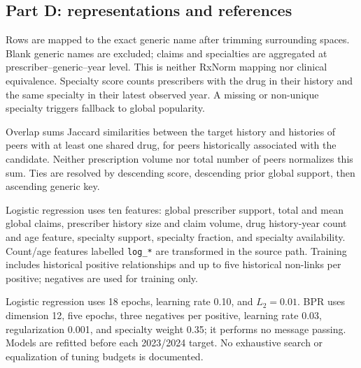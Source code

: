 \documentclass[10pt,a4paper]{article}
\newcommand{\src}[1]{{\small\nolinkurl{#1}}}
\begin{document}
\subsection{Part D: representations and references}
Rows are mapped to the exact generic name after trimming surrounding spaces. Blank generic names are excluded; claims and specialties are aggregated at prescriber--generic--year level. This is neither RxNorm mapping nor clinical equivalence. Specialty score counts prescribers with the drug in their history and the same specialty in their latest observed year. A missing or non-unique specialty triggers fallback to global popularity.

Overlap sums Jaccard similarities between the target history and histories of peers with at least one shared drug, for peers historically associated with the candidate. Neither prescription volume nor total number of peers normalizes this sum. Ties are resolved by descending score, descending prior global support, then ascending generic key\cite{hgbcode,hgbpartd}.

Logistic regression uses ten features: global prescriber support, total and mean global claims, prescriber history size and claim volume, drug history-year count and age feature, specialty support, specialty fraction, and specialty availability. Count/age features labelled \src{log_*} are transformed in the source path. Training includes historical positive relationships and up to five historical non-links per positive; negatives are used for training only.

Logistic regression uses 18 epochs, learning rate 0.10, and $L_2=0.01$. BPR uses dimension 12, five epochs, three negatives per positive, learning rate 0.03, regularization 0.001, and specialty weight 0.35; it performs no message passing. Models are refitted before each 2023/2024 target. No exhaustive search or equalization of tuning budgets is documented.

\par{}
\end{document}
